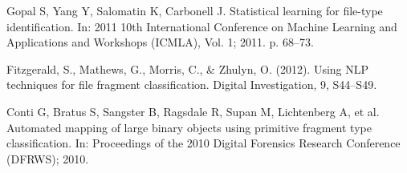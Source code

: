 Gopal S, Yang Y, Salomatin K, Carbonell J. Statistical learning for file-type identification. In: 2011 10th International Conference on Machine Learning and Applications and Workshops (ICMLA), Vol. 1; 2011. p. 68–73.

Fitzgerald, S., Mathews, G., Morris, C., \& Zhulyn, O. (2012). Using NLP techniques for file fragment classification. Digital Investigation, 9, S44–S49.

Conti G, Bratus S, Sangster B, Ragsdale R, Supan M, Lichtenberg A, et al. Automated mapping of large binary objects using primitive fragment type classification. In: Proceedings of the 2010 Digital Forensics Research Conference (DFRWS); 2010.
